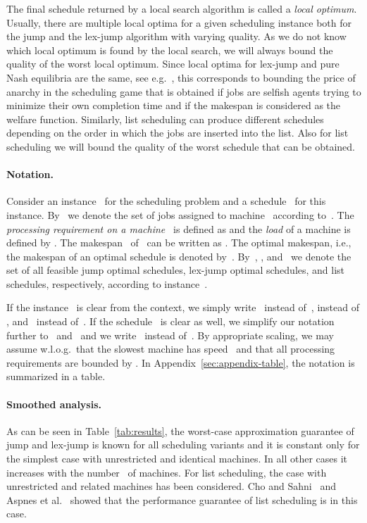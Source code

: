 \documentclass[a4paper,11pt,fleqn]{article}
\begin{document}
The final schedule returned by a local search algorithm is called a \emph{local optimum}.
Usually, there are multiple local optima for a given scheduling
instance both for the jump and the lex-jump algorithm with varying quality.
As we do not know which local optimum is found by the local search, we 
will always bound the quality of the worst local optimum. Since local optima
for lex-jump and pure Nash equilibria are the same, see e.g.~\cite{Voecking:2007:AGT}, this corresponds
to bounding the price of anarchy in the scheduling game that is obtained if 
jobs are selfish agents trying to minimize their own completion time and if the
makespan is considered as the welfare function.
Similarly, list scheduling can produce different schedules
depending on the order in which the jobs are inserted into the list. Also for
list scheduling we will bound the quality of the worst schedule that can be
obtained. 


\paragraph{Notation.}

Consider an
instance~ for the scheduling problem and a schedule~ for this
instance. By~ we denote the set of jobs
assigned to machine~ according to~. The \emph{processing requirement
on a machine~} is defined as 
and the \emph{load} of a machine is defined by .
The makespan~ of~ can be written as . The optimal makespan, i.e., the
makespan of an optimal schedule is denoted by~. By~,
, and~ we denote the set of all feasible jump optimal
schedules, lex-jump optimal schedules, and list schedules, respectively,
according to instance~.

If the instance~ is clear from the context, we simply
write~ instead of~, 
instead of , and~ instead of~. If the
schedule~ is clear as well, we simplify our notation further
to~ and~ and we write~ instead
of~. By appropriate scaling, we may assume w.l.o.g.\
that the slowest machine has speed~ and that all processing 
requirements are bounded by .
In Appendix~\ref{sec:appendix-table}, the notation is summarized in a table.

\paragraph{Smoothed analysis.} 
As can be seen in Table~\ref{tab:results}, the worst-case
approximation guarantee of jump and lex-jump is known for all scheduling
variants and it is constant only for the simplest case with unrestricted
and identical machines. In all other cases it increases with the number~
of machines. For list scheduling, the case with unrestricted and
related machines has been considered. Cho and Sahni~\cite{Cho+Sahni:1980} and Aspnes et al.~\cite{DBLP:journals/jacm/AspnesAFPW97} showed that the performance guarantee of list scheduling is  in this case.
\end{document}
